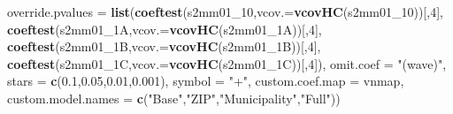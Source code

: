 \documentclass[
]{article}
\newenvironment{Shaded}{\begin{snugshade}}{\end{snugshade}}
\newcommand{\DataTypeTok}[1]{\textcolor[rgb]{0.13,0.29,0.53}{#1}}
\newcommand{\DecValTok}[1]{\textcolor[rgb]{0.00,0.00,0.81}{#1}}
\newcommand{\FloatTok}[1]{\textcolor[rgb]{0.00,0.00,0.81}{#1}}
\newcommand{\KeywordTok}[1]{\textcolor[rgb]{0.13,0.29,0.53}{\textbf{#1}}}
\newcommand{\NormalTok}[1]{#1}
\newcommand{\StringTok}[1]{\textcolor[rgb]{0.31,0.60,0.02}{#1}}
\begin{document}
\begin{Shaded}
\begin{Highlighting}[]
          \DataTypeTok{override.pvalues =} \KeywordTok{list}\NormalTok{(}\KeywordTok{coeftest}\NormalTok{(s2mm01_}\DecValTok{10}\NormalTok{,}\DataTypeTok{vcov.=}\KeywordTok{vcovHC}\NormalTok{(s2mm01_}\DecValTok{10}\NormalTok{))[,}\DecValTok{4}\NormalTok{],}
                                  \KeywordTok{coeftest}\NormalTok{(s2mm01_1A,}\DataTypeTok{vcov.=}\KeywordTok{vcovHC}\NormalTok{(s2mm01_1A))[,}\DecValTok{4}\NormalTok{],}
                                  \KeywordTok{coeftest}\NormalTok{(s2mm01_1B,}\DataTypeTok{vcov.=}\KeywordTok{vcovHC}\NormalTok{(s2mm01_1B))[,}\DecValTok{4}\NormalTok{],}
                                  \KeywordTok{coeftest}\NormalTok{(s2mm01_1C,}\DataTypeTok{vcov.=}\KeywordTok{vcovHC}\NormalTok{(s2mm01_1C))[,}\DecValTok{4}\NormalTok{]),}
          \DataTypeTok{omit.coef =} \StringTok{"(wave)"}\NormalTok{, }\DataTypeTok{stars =} \KeywordTok{c}\NormalTok{(}\FloatTok{0.1}\NormalTok{,}\FloatTok{0.05}\NormalTok{,}\FloatTok{0.01}\NormalTok{,}\FloatTok{0.001}\NormalTok{), }\DataTypeTok{symbol =} \StringTok{"+"}\NormalTok{,}
          \DataTypeTok{custom.coef.map =}\NormalTok{ vnmap, }
          \DataTypeTok{custom.model.names =} \KeywordTok{c}\NormalTok{(}\StringTok{"Base"}\NormalTok{,}\StringTok{"ZIP"}\NormalTok{,}\StringTok{"Municipality"}\NormalTok{,}\StringTok{"Full"}\NormalTok{))}
\end{Highlighting}
\end{Shaded}
\end{document}
